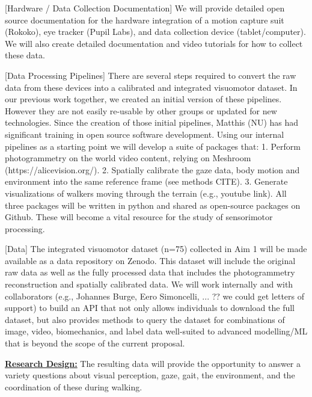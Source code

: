 [Hardware / Data Collection Documentation] We will provide detailed open source documentation for the hardware integration of a motion capture suit (Rokoko), eye tracker (Pupil Labs), and data collection device (tablet/computer). We will also create detailed documentation and video tutorials for how to collect these data.

[Data Processing Pipelines] There are several steps required to convert the raw data from these devices into a calibrated and integrated visuomotor dataset. In our previous work together, we created an initial version of these pipelines. However they are not easily re-usable by other groups or updated for new technologies. Since the creation of those initial pipelines, Matthis (NU)
has had significant training in open source software development. Using our internal pipelines as a starting point we will develop a suite of packages that: 1. Perform photogrammetry on the world video content, relying on Meshroom (https://alicevision.org/). 2. Spatially calibrate the gaze data, body motion and environment into the same reference frame (see methods CITE). 3. Generate visualizations of walkers moving through the terrain (e.g., youtube link). All three packages will be written in
python and shared as open-source packages on Github.  These will become a vital resource for the study of sensorimotor processing.  

[Data] The integrated visuomotor dataset (n=75) collected in Aim 1 will be made available as a data repository on Zenodo. This dataset will include the original raw data as well as the fully processed data that includes the photogrammetry reconstruction and spatially calibrated data.  We will work internally and with collaborators (e.g., Johannes Burge, Eero Simoncelli, ... ?? we could get letters of support) to build an API that not only allows individuals to download the full dataset, but also provides methods to query the dataset for combinations of image, video, biomechanics, and label data well-suited to advanced modelling/ML that is beyond the scope of the current proposal.

\noindent\underline{\textbf{Research Design:}} The resulting data will provide the opportunity to answer a variety questions about visual perception, gaze, gait, the environment, and the coordination of these during walking.

